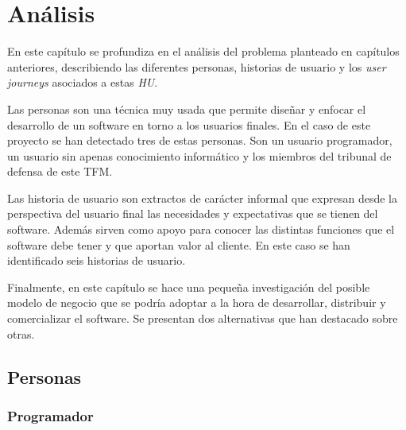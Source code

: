 \chapter{Análisis}

En este capítulo se profundiza en el análisis del problema planteado en capítulos anteriores, describiendo las diferentes personas, historias de usuario y los \textit{user journeys} asociados a estas \textit{HU}.

Las personas son una técnica muy usada que permite diseñar y enfocar el desarrollo de un software en torno a los usuarios finales. En el caso de este proyecto se han detectado tres de estas personas. Son un usuario programador, un usuario sin apenas conocimiento informático y los miembros del tribunal de defensa de este TFM.

Las historia de usuario son extractos de carácter informal que expresan desde la perspectiva del usuario final las necesidades y expectativas que se tienen del software. Además sirven como apoyo para conocer las distintas funciones que el software debe tener y que aportan valor al cliente. En este caso se han identificado seis historias de usuario.

Finalmente, en este capítulo se hace una pequeña investigación del posible modelo de negocio que se podría adoptar a la hora de desarrollar, distribuir y comercializar el software. Se presentan dos alternativas que han destacado sobre otras.

\pagebreak

\section{Personas}

\subsection{Programador}
\label{sec:personaProgramador}

